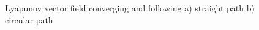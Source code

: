 \documentclass[conf]{new-aiaa}
\begin{document}
\begin{figure}[H]
	\begin{subfigmatrix}{2}%
		\centering	
		\hspace*{0mm}
	\end{subfigmatrix}
	\caption{Lyapunov vector field converging and following a) straight path b) circular path}
	\label{fig:vfPrimitives}
\end{figure}
\end{document}
